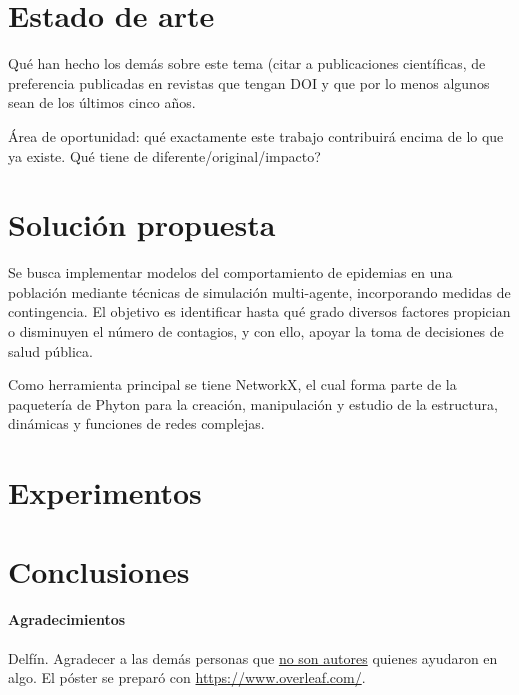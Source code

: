 \documentclass{sciposter}
\begin{document}
\section{Estado de arte}

Qué han hecho los demás sobre este tema (citar a publicaciones científicas, de preferencia publicadas en revistas que tengan DOI y que por lo menos algunos sean de los últimos cinco años.

Área de oportunidad: qué exactamente este trabajo contribuirá encima de lo que ya existe.  {\textquestiondown}Qué tiene de diferente/original/impacto?

\section{Solución propuesta}
Se busca implementar modelos del comportamiento de epidemias en una población mediante técnicas de simulación multi-agente, incorporando medidas de contingencia. El objetivo es identificar hasta qué grado diversos factores propician o disminuyen el número de contagios, y con ello, apoyar la toma de decisiones de salud pública.

Como herramienta principal se tiene NetworkX, el cual forma parte de la paquetería de Phyton para la creación, manipulación y estudio de la estructura, dinámicas y funciones de redes complejas.

\section{Experimentos}

\section{Conclusiones}

\paragraph{Agradecimientos}

{\small Delfín. Agradecer a las demás personas que \underline{no son
    autores} quienes ayudaron en algo. El póster se preparó con \url{https://www.overleaf.com/}.}
\end{document}
